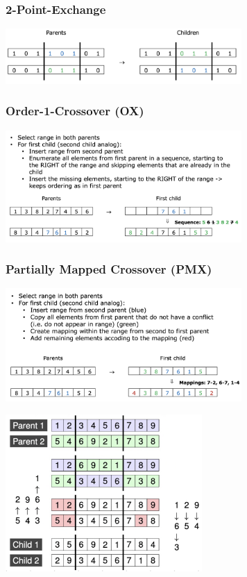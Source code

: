 \documentclass[10pt,a4paper,twocolumn]{article}
\begin{document}
\subsubsection{2-Point-Exchange}
\begin{center}
	\includegraphics[width=9cm]{images/2-point-exchange}
\end{center}

\subsubsection{Order-1-Crossover (OX)}
\begin{center}
	\includegraphics[width=9cm]{images/order-1-crossover}
\end{center}

\subsubsection{Partially Mapped Crossover (PMX)}
\begin{center}
	\includegraphics[width=9cm]{images/pmx-crossover}
\end{center}

\begin{center}
	\includegraphics[width=7.5cm]{images/pmx-crossover2}
\end{center}
\end{document}
